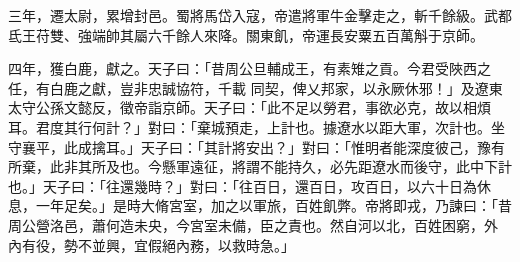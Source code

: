\begin{pinyinscope}
 三年，遷太尉，累增封邑。蜀將馬岱入寇，帝遣將軍牛金擊走之，斬千餘級。武都氐王苻雙、強端帥其屬六千餘人來降。關東飢，帝運長安粟五百萬斛于京師。



 四年，獲白鹿，獻之。天子曰：「昔周公旦輔成王，有素雉之貢。今君受陜西之任，有白鹿之獻，豈非忠誠協符，千載
 同契，俾乂邦家，以永厥休邪！」及遼東太守公孫文懿反，徵帝詣京師。天子曰：「此不足以勞君，事欲必克，故以相煩耳。君度其行何計？」對曰：「棄城預走，上計也。據遼水以距大軍，次計也。坐守襄平，此成擒耳。」天子曰：「其計將安出？」對曰：「惟明者能深度彼己，豫有所棄，此非其所及也。今懸軍遠征，將謂不能持久，必先距遼水而後守，此中下計也。」天子曰：「往還幾時？」對曰：「往百日，還百日，攻百日，以六十日為休息，一年足矣。」是時大脩宮室，加之以軍旅，百姓飢弊。帝將即戎，乃諫曰：「昔周公營洛邑，蕭何造未央，今宮室未備，臣之責也。然自河以北，百姓困窮，外
 內有役，勢不並興，宜假絕內務，以救時急。」




\end{pinyinscope}
